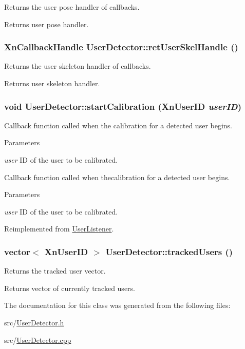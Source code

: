 \label{classUserDetector_aaf575a95cfe6d448c9869cabd873cf8d}
Returns the user pose handler of callbacks. \begin{DoxyReturn}{Returns}
user pose handler. 
\end{DoxyReturn}
\hypertarget{classUserDetector_a556ec55f8cfc05990c369392a46a9951}{
\subsubsection[{retUserSkelHandle}]{\setlength{\rightskip}{0pt plus 5cm}XnCallbackHandle UserDetector::retUserSkelHandle ()}}
\label{classUserDetector_a556ec55f8cfc05990c369392a46a9951}
Returns the user skeleton handler of callbacks. \begin{DoxyReturn}{Returns}
user skeleton handler. 
\end{DoxyReturn}
\hypertarget{classUserDetector_a2681776dca3ec63bfc77528504354512}{
\subsubsection[{startCalibration}]{\setlength{\rightskip}{0pt plus 5cm}void UserDetector::startCalibration (XnUserID {\em userID})}}
\label{classUserDetector_a2681776dca3ec63bfc77528504354512}
Callback function called when the calibration for a detected user begins. 
\begin{DoxyParams}{Parameters}
\item[{\em user}]ID of the user to be calibrated.\end{DoxyParams}
Callback function called when thecalibration for a detected user begins. 
\begin{DoxyParams}{Parameters}
\item[{\em user}]ID of the user to be calibrated. \end{DoxyParams}


Reimplemented from \hyperlink{classUserListener_ae54282ac916fa8e2735b69a4d474c73a}{UserListener}.

\hypertarget{classUserDetector_af00e561a7bac57f09c2a8c29d69d912a}{
\subsubsection[{trackedUsers}]{\setlength{\rightskip}{0pt plus 5cm}vector$<$ XnUserID $>$ UserDetector::trackedUsers ()}}
\label{classUserDetector_af00e561a7bac57f09c2a8c29d69d912a}
Returns the tracked user vector. \begin{DoxyReturn}{Returns}
vector of currently tracked users. 
\end{DoxyReturn}


The documentation for this class was generated from the following files:\begin{DoxyCompactItemize}
\item 
src/\hyperlink{UserDetector_8h}{UserDetector.h}\item 
src/\hyperlink{UserDetector_8cpp}{UserDetector.cpp}\end{DoxyCompactItemize}
